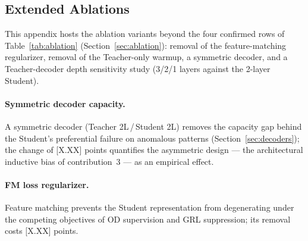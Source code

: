 \subsection{Extended Ablations}
\label{sec:extended_ablations}

This appendix hosts the ablation variants beyond the four confirmed rows of
Table~\ref{tab:ablation} (Section~\ref{sec:ablation}): removal of the feature-matching
regularizer, removal of the Teacher-only warmup, a symmetric decoder, and a Teacher-decoder
depth sensitivity study (3/2/1 layers against the 2-layer Student).

\paragraph{Symmetric decoder capacity.}
A symmetric decoder (Teacher 2L\,/\,Student 2L) removes the capacity gap behind the Student's
preferential failure on anomalous patterns (Section~\ref{sec:decoders}); the change of [X.XX]
points quantifies the asymmetric design --- the architectural inductive bias of contribution~3
--- as an empirical effect.

\paragraph{FM loss regularizer.}
Feature matching prevents the Student representation from degenerating under the competing
objectives of OD supervision and GRL suppression; its removal costs [X.XX] points.

